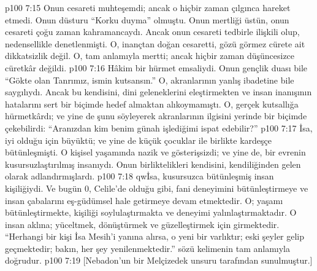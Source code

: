 \vs p100 7:15 Onun cesareti muhteşemdi; ancak o hiçbir zaman çılgınca hareket etmedi. Onun düsturu “Korku duyma” olmuştu. Onun mertliği üstün, onun cesareti çoğu zaman kahramancaydı. Ancak onun cesareti tedbirle ilişkili olup, nedensellikle denetlenmişti. O, inançtan doğan cesaretti, gözü görmez cürete ait dikkatsizlik değil. O, tam anlamıyla mertti; ancak hiçbir zaman düşüncesizce cüretkâr değildi.
\vs p100 7:16 Hâkim bir hürmet emsaliydi. Onun gençlik duası bile “Gökte olan Tanrımız, ismin kutsansın.” O, akranlarının yanlış ibadetine bile saygılıydı. Ancak bu kendisini, dini geleneklerini eleştirmekten ve insan inanışının hatalarını sert bir biçimde hedef almaktan alıkoymamıştı. O, gerçek kutsallığa hürmetkârdı; ve yine de şunu söyleyerek akranlarının ilgisini yerinde bir biçimde çekebilirdi: “Aranızdan kim benim günah işlediğimi ispat edebilir?”
\vs p100 7:17 İsa, iyi olduğu için büyüktü; ve yine de küçük çocuklar ile birlikte kardeşçe bütünleşmişti. O kişisel yaşamında nazik ve gösterişsizdi; ve yine de, bir evrenin kusursuzlaştırılmış insanıydı. Onun birliktelikleri kendisini, kendiliğinden gelen olarak adlandırmışlardı.
\vs p100 7:18 qwİsa, kusursuzca bütünleşmiş insan kişiliğiydi. Ve bugün 0, Celile’de olduğu gibi, fani deneyimini bütünleştirmeye ve insan çabalarını eş\hyp{}güdümsel hale getirmeye devam etmektedir. O; yaşamı bütünleştirmekte, kişiliği soylulaştırmakta ve deneyimi yalınlaştırmaktadır. O insan aklına; yüceltmek, dönüştürmek ve güzelleştirmek için girmektedir. “Herhangi bir kişi İsa Mesih’i yanına alırsa, o yeni bir varlıktır; eski şeyler gelip geçmektedir; bakın, her şey yenilenmektedir.” sözü kelimenin tam anlamıyla doğrudur.
\vs p100 7:19 [Nebadon’un bir Melçizedek unsuru tarafından sunulmuştur.]

